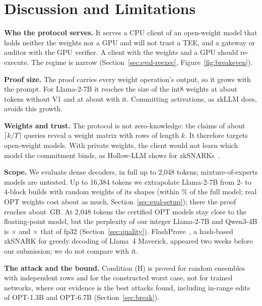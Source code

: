 \providecommand{\para}[1]{\par\noindent\textbf{#1}\quad}
\providecommand{\todo}[1]{\textbf{[TODO: #1]}}
\providecommand{\sC}{\mathsf{C}}
\providecommand{\Kpre}{\mathsf{K}_{\mathrm{pre}}}

\section{Discussion and Limitations}
\label{sec:discussion}

\para{Who the protocol serves.} It serves a CPU client of an open-weight model that holds neither
the weights nor a GPU and will not trust a TEE, and a gateway or auditor with the GPU verifier. A
client with the weights and a GPU should re-execute. The regime is narrow
(Section~\ref{sec:eval-reexec}, Figure~\ref{fig:breakeven}).

\para{Proof size.} The proof carries every weight operation's output, so it grows with the prompt.
For Llama-2-7B it reaches the size of the int8 weights at about \BreakevenTokens{} tokens without V1 and at about
\BreakevenTokensVOne{} with it. Committing activations, as zkLLM does, avoids this growth.

\para{Weights and trust.} The protocol is not zero-knowledge: the claims of about
$\lceil k/T\rceil$ queries reveal a weight matrix with rows of length $k$. It therefore targets
open-weight models. With private weights, the client would not learn which model the commitment
binds, as Hollow-LLM shows for zkSNARKs~\cite{hollowllm}.

\para{Scope.} We evaluate dense decoders, in full up to 2{,}048 tokens; mixture-of-experts models
are untested. Up to 16{,}384 tokens we extrapolate Llama-2-7B from 2- to 4-block builds with random weights of its shapes (within \LongCheckMax{}\% of the full model; real
OPT weights cost about as much, Section~\ref{sec:eval-setup}); there the proof reaches about
\LongProofLong{}\,GB. At 2{,}048 tokens the certified OPT models stay close to the floating-point
model, but the perplexity of our integer Llama-2-7B and Qwen3-4B is \LlamaSevenRatio{}$\times$ and
\QwenLRatio{}$\times$ that of fp32 (Section~\ref{sec:quality}). FlashProve~\cite{flashprove}, a hash-based zkSNARK for greedy decoding of
Llama~4 Maverick, appeared two weeks before our submission; we do not compare with it.

\para{The attack and the bound.} Condition (H) is proved for random ensembles with independent rows
and for the constructed worst case, not for trained networks, where our evidence is the best
attacks found, including in-range edits of OPT-1.3B and OPT-6.7B (Section~\ref{sec:break}).

